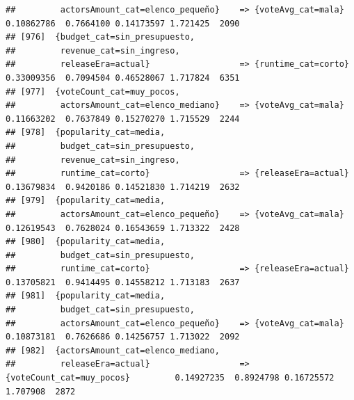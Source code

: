 \documentclass[
]{article}
\begin{document}
\begin{verbatim}
##         actorsAmount_cat=elenco_pequeño}    => {voteAvg_cat=mala}                0.10862786  0.7664100 0.14173597 1.721425  2090
## [976]  {budget_cat=sin_presupuesto,                                                                                             
##         revenue_cat=sin_ingreso,                                                                                                
##         releaseEra=actual}                  => {runtime_cat=corto}               0.33009356  0.7094504 0.46528067 1.717824  6351
## [977]  {voteCount_cat=muy_pocos,                                                                                                
##         actorsAmount_cat=elenco_mediano}    => {voteAvg_cat=mala}                0.11663202  0.7637849 0.15270270 1.715529  2244
## [978]  {popularity_cat=media,                                                                                                   
##         budget_cat=sin_presupuesto,                                                                                             
##         revenue_cat=sin_ingreso,                                                                                                
##         runtime_cat=corto}                  => {releaseEra=actual}               0.13679834  0.9420186 0.14521830 1.714219  2632
## [979]  {popularity_cat=media,                                                                                                   
##         actorsAmount_cat=elenco_pequeño}    => {voteAvg_cat=mala}                0.12619543  0.7628024 0.16543659 1.713322  2428
## [980]  {popularity_cat=media,                                                                                                   
##         budget_cat=sin_presupuesto,                                                                                             
##         runtime_cat=corto}                  => {releaseEra=actual}               0.13705821  0.9414495 0.14558212 1.713183  2637
## [981]  {popularity_cat=media,                                                                                                   
##         budget_cat=sin_presupuesto,                                                                                             
##         actorsAmount_cat=elenco_pequeño}    => {voteAvg_cat=mala}                0.10873181  0.7626686 0.14256757 1.713022  2092
## [982]  {actorsAmount_cat=elenco_mediano,                                                                                        
##         releaseEra=actual}                  => {voteCount_cat=muy_pocos}         0.14927235  0.8924798 0.16725572 1.707908  2872

\end{verbatim}
\end{document}
